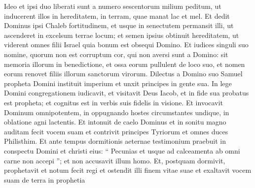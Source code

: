 \begin{biblechapter}
\begin{biblechapter}
\begin{biblechapter}
\begin{biblechapter}
\begin{biblechapter}
\begin{biblechapter}
\begin{biblechapter}
\begin{biblechapter}
\begin{biblechapter}
\begin{biblechapter}
\begin{biblechapter}
\begin{biblechapter}
\begin{biblechapter}
\begin{biblechapter}
\begin{biblechapter}
\begin{biblechapter}
\begin{biblechapter}
\begin{biblechapter}
\begin{biblechapter}
\begin{biblechapter}
\begin{biblechapter}
\begin{biblechapter}
\begin{biblechapter}
\begin{biblechapter}
\begin{biblechapter}
\begin{biblechapter}
\begin{biblechapter}
\begin{biblechapter}
\begin{biblechapter}
\begin{biblechapter}
\begin{biblechapter}
\begin{biblechapter}
\begin{biblechapter}
\begin{biblechapter}
\begin{biblechapter}
\begin{biblechapter}
\begin{biblechapter}
\begin{biblechapter}
\begin{biblechapter}
\begin{biblechapter}
\begin{biblechapter}
\begin{biblechapter}
\begin{biblechapter}
\begin{biblechapter}
\begin{biblechapter}
\begin{biblechapter}
 \verse Ideo et ipsi duo liberati sunt
 a numero sescentorum milium peditum,
 ut inducerent illos in hereditatem,
 in terram, quae manat lac et mel.
 \verse Et dedit Dominus ipsi Chaleb fortitudinem,
 et usque in senectutem permansit illi,
 ut ascenderet in excelsum terrae locum;
 et semen ipsius obtinuit hereditatem,
 \verse ut viderent omnes filii Israel
 quia bonum est obsequi Domino.
 \verse Et iudices singuli suo nomine,
 quorum non est corruptum cor,
 qui non aversi sunt a Domino:
 \verse sit memoria illorum in benedictione, et ossa eorum pullulent de loco suo,
 \verse et nomen eorum renovet
 filiis illorum sanctorum virorum.
 \verse Dilectus a Domino suo Samuel
 propheta Domini instituit imperium
 et unxit principes in gente sua.
 \verse In lege Domini congregationem iudicavit,
 et visitavit Deus Iacob,
 et in fide sua probatus est propheta;
 \verse et cognitus est in verbis suis fidelis in visione.
 \verse Et invocavit Dominum omnipotentem,
 in oppugnando hostes circumstantes undique,
 in oblatione agni lactentis.
 \verse Et intonuit de caelo Dominus
 et in sonitu magno auditam fecit vocem suam
 \verse et contrivit principes Tyriorum
 et omnes duces Philisthim.
 \verse Et ante tempus dormitionis aeternae
 testimonium praebuit in conspectu Domini et christi eius:
 “ Pecunias et usque ad calceamenta
 ab omni carne non accepi ”;
 et non accusavit illum homo.
 \verse Et, postquam dormivit, prophetavit
 et notum fecit regi et ostendit illi finem vitae suae
 et exaltavit vocem suam de terra in prophetia

\end{biblechapter}
\end{biblechapter}
\end{biblechapter}
\end{biblechapter}
\end{biblechapter}
\end{biblechapter}
\end{biblechapter}
\end{biblechapter}
\end{biblechapter}
\end{biblechapter}
\end{biblechapter}
\end{biblechapter}
\end{biblechapter}
\end{biblechapter}
\end{biblechapter}
\end{biblechapter}
\end{biblechapter}
\end{biblechapter}
\end{biblechapter}
\end{biblechapter}
\end{biblechapter}
\end{biblechapter}
\end{biblechapter}
\end{biblechapter}
\end{biblechapter}
\end{biblechapter}
\end{biblechapter}
\end{biblechapter}
\end{biblechapter}
\end{biblechapter}
\end{biblechapter}
\end{biblechapter}
\end{biblechapter}
\end{biblechapter}
\end{biblechapter}
\end{biblechapter}
\end{biblechapter}
\end{biblechapter}
\end{biblechapter}
\end{biblechapter}
\end{biblechapter}
\end{biblechapter}
\end{biblechapter}
\end{biblechapter}
\end{biblechapter}
\end{biblechapter}
